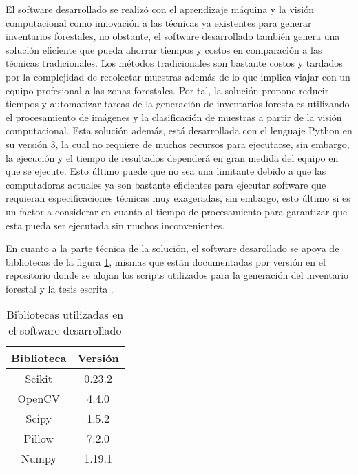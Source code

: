 El software desarrollado se realizó con el aprendizaje máquina y la visión computacional como innovación a las técnicas ya existentes para generar inventarios forestales, no obstante, el software desarrollado también genera una solución eficiente que pueda ahorrar tiempos y costos en comparación a las técnicas tradicionales. Los métodos tradicionales son bastante costos y tardados por la complejidad de recolectar muestras además de lo que implica viajar con un equipo profesional a las zonas forestales. Por tal, la solución propone reducir tiempos y automatizar tareas de la generación de inventarios forestales utilizando el procesamiento de imágenes y la clasificación de muestras a partir de la visión computacional. 
\clearpage
Esta solución además, está desarrollada con el lenguaje Python en su versión 3, la cual no requiere de muchos recursos para ejecutarse, sin embargo, la ejecución y el tiempo de resultados dependerá en gran medida del equipo en que se ejecute. Esto último puede que no sea una limitante debido a que las computadoras actuales ya son bastante eficientes para ejecutar software que requieran especificaciones técnicas muy exageradas, sin embargo, esto último  si es un factor a considerar en cuanto al tiempo de procesamiento para garantizar que esta pueda ser ejecutada sin muchos inconvenientes. 

En cuanto a la parte técnica de la solución, el software desarollado se apoya de bibliotecas de la figura \ref{Bibliotecas utilizadas en el software desarrollado}, mismas que están documentadas por versión en el repositorio donde se alojan los scripts utilizados para la generación del inventario forestal y la tesis escrita \citep{rf18}.

\begin{table}[H]
	{\centering
		\caption{Bibliotecas utilizadas en el software desarrollado}
		\begin{tabular}{|c|c|}
			\hline
			Biblioteca & Versión\\
			\hline
			Scikit & 0.23.2\\
			\hline
			OpenCV & 4.4.0\\
			\hline
			Scipy & 1.5.2\\
			\hline
			Pillow & 7.2.0\\
			\hline
			Numpy & 1.19.1\\
			\hline
		\end{tabular}

	\label{Bibliotecas utilizadas en el software desarrollado}}
\end{table}
\clearpage
